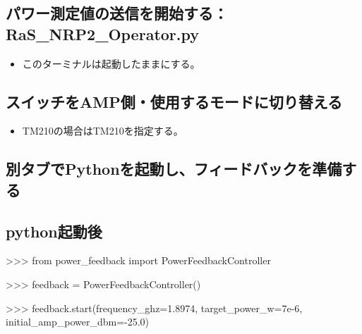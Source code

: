 \documentclass[a4paper,11pt]{ltjsarticle}
\begin{document}
\subsection{パワー測定値の送信を開始する：RaS\_NRP2\_Operator.py}

\begin{command}


\end{command}

\begin{itemize}

\item このターミナルは起動したままにする。

\end{itemize}

\subsection{スイッチをAMP側・使用するモードに切り替える}

\begin{command}


\end{command}

\begin{itemize}

\item TM210の場合はTM210を指定する。

\end{itemize}

\subsection{別タブでPythonを起動し、フィードバックを準備する}

\subsection{python起動後}

\begin{command}

>>> from power_feedback import PowerFeedbackController

>>> feedback = PowerFeedbackController()

>>> feedback.start(frequency_ghz=1.8974, target_power_w=7e-6, initial_amp_power_dbm=-25.0)

\end{command}
\end{document}
